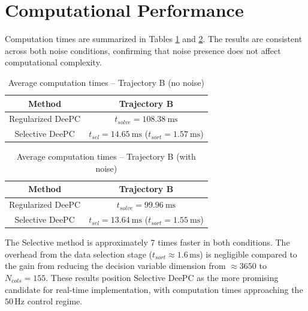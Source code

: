 \section{Computational Performance}

Computation times are summarized in Tables \ref{tab:czasy_bez_szumu} and \ref{tab:czasy_szum}. The results are consistent across both noise conditions, confirming that noise presence does not affect computational complexity.

\begin{table}[!htbp]
    \centering
    \caption{Average computation times -- Trajectory B (no noise)}
    \label{tab:czasy_bez_szumu}
    \renewcommand{\arraystretch}{1.4}
    \begin{tabular}{c c}
        \toprule
        \textbf{Method} & \textbf{Trajectory B} \\
        \midrule
        Regularized DeePC & $t_{solve} = 108.38~\mathrm{ms}$ \\
        Selective DeePC & $t_{sel} = \mathbf{14.65}~\mathrm{ms}$ \quad ($t_{sort} = 1.57~\mathrm{ms}$) \\
        \bottomrule
    \end{tabular}
\end{table}

\begin{table}[!htbp]
    \centering
    \caption{Average computation times -- Trajectory B (with noise)}
    \label{tab:czasy_szum}
    \renewcommand{\arraystretch}{1.4}
    \begin{tabular}{c c}
        \toprule
        \textbf{Method} & \textbf{Trajectory B} \\
        \midrule
        Regularized DeePC & $t_{solve} = 99.96~\mathrm{ms}$ \\
        Selective DeePC & $t_{sel} = \mathbf{13.64}~\mathrm{ms}$ \quad ($t_{sort} = 1.55~\mathrm{ms}$) \\
        \bottomrule
    \end{tabular}
\end{table}

The Selective method is approximately 7 times faster in both conditions. The overhead from the data selection stage ($t_{sort} \approx 1.6\,\mathrm{ms}$) is negligible compared to the gain from reducing the decision variable dimension from $\approx3650$ to $N_{cols}=155$. These results position Selective DeePC as the more promising candidate for real-time implementation, with computation times approaching the $50\,\mathrm{Hz}$ control regime.

